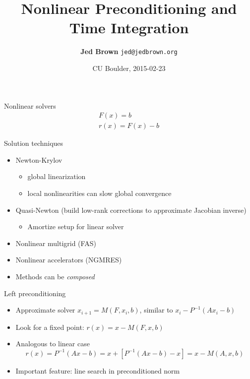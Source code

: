 \documentclass{beamer}
\title{Nonlinear Preconditioning and Time Integration}
\author{{\bf Jed Brown} \texttt{jed@jedbrown.org} \\
}
\date{CU Boulder, 2015-02-23}
\begin{document}
\lstset{language=C}
\normalem

\begin{frame}
  \titlepage
\end{frame}

\begin{frame}{Nonlinear solvers}
  \begin{gather*}
    F(x) = b \\
    r(x) = F(x) - b
  \end{gather*}
  \begin{block}{Solution techniques}
    \begin{itemize}
    \item Newton-Krylov
      \begin{itemize}
      \item global linearization
      \item local nonlinearities can slow global convergence
      \end{itemize}
    \item Quasi-Newton (build low-rank corrections to approximate Jacobian inverse)
      \begin{itemize}
      \item Amortize setup for linear solver
      \end{itemize}
    \item Nonlinear multigrid (FAS)
    \item Nonlinear accelerators (NGMRES)
    \item Methods can be \emph{composed}
    \end{itemize}
  \end{block}
\end{frame}

\begin{frame}{Left preconditioning}
  \begin{itemize}
  \item Approximate solver $x_{i+1} = M(F,x_i,b)$, similar to $x_i - P^{-1}(A x_i - b)$
  \item Look for a fixed point: $r(x) = x - M(F,x,b)$
  \item Analogous to linear case
    \begin{equation*}
      r(x) = P^{-1} (A x - b) = x + [P^{-1} (A x - b) - x] = x - M(A,x,b)
    \end{equation*}
  \item Important feature: line search in preconditioned norm
  \end{itemize}
\end{frame}
\end{document}
